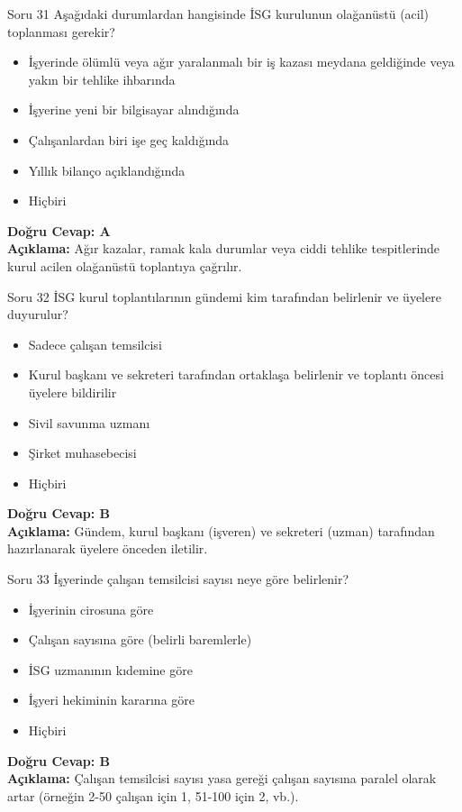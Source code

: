 \documentclass[12pt,a4paper]{article}
\begin{document}
\begin{testcard}{Soru 31}
    Aşağıdaki durumlardan hangisinde İSG kurulunun olağanüstü (acil) toplanması gerekir?
    \begin{itemize}
        \item[A)] İşyerinde ölümlü veya ağır yaralanmalı bir iş kazası meydana geldiğinde veya yakın bir tehlike ihbarında
        \item[B)] İşyerine yeni bir bilgisayar alındığında
        \item[C)] Çalışanlardan biri işe geç kaldığında
        \item[D)] Yıllık bilanço açıklandığında
        \item[E)] Hiçbiri
    \end{itemize}
    \tcblower
    \textbf{Doğru Cevap: A} \\
    \textbf{Açıklama:} Ağır kazalar, ramak kala durumlar veya ciddi tehlike tespitlerinde kurul acilen olağanüstü toplantıya çağrılır.
\end{testcard}

\begin{testcard}{Soru 32}
    İSG kurul toplantılarının gündemi kim tarafından belirlenir ve üyelere duyurulur?
    \begin{itemize}
        \item[A)] Sadece çalışan temsilcisi
        \item[B)] Kurul başkanı ve sekreteri tarafından ortaklaşa belirlenir ve toplantı öncesi üyelere bildirilir
        \item[C)] Sivil savunma uzmanı
        \item[D)] Şirket muhasebecisi
        \item[E)] Hiçbiri
    \end{itemize}
    \tcblower
    \textbf{Doğru Cevap: B} \\
    \textbf{Açıklama:} Gündem, kurul başkanı (işveren) ve sekreteri (uzman) tarafından hazırlanarak üyelere önceden iletilir.
\end{testcard}

\begin{testcard}{Soru 33}
    İşyerinde çalışan temsilcisi sayısı neye göre belirlenir?
    \begin{itemize}
        \item[A)] İşyerinin cirosuna göre
        \item[B)] Çalışan sayısına göre (belirli baremlerle)
        \item[C)] İSG uzmanının kıdemine göre
        \item[D)] İşyeri hekiminin kararına göre
        \item[E)] Hiçbiri
    \end{itemize}
    \tcblower
    \textbf{Doğru Cevap: B} \\
    \textbf{Açıklama:} Çalışan temsilcisi sayısı yasa gereği çalışan sayısına paralel olarak artar (örneğin 2-50 çalışan için 1, 51-100 için 2, vb.).
\end{testcard}
\end{document}
